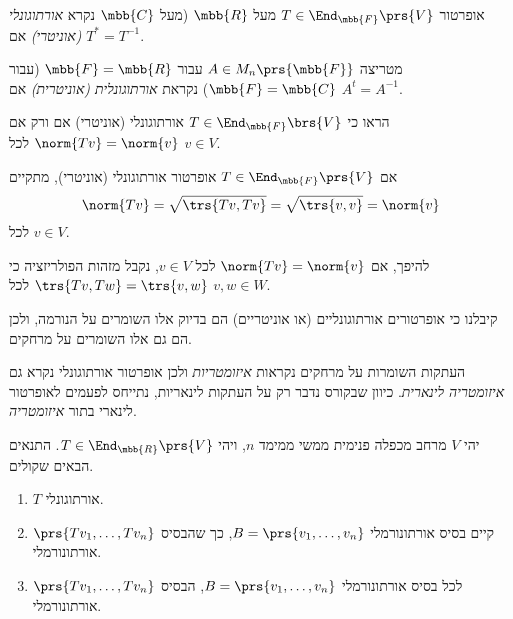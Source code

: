 \documentclass[a4paper,10pt,twoside,openany]{book}
\begin{document}
\begin{definition}
אופרטור
$T \in \End_{\mbb{F}}\prs{V}$
מעל
$\mbb{R}$
(מעל
$\mbb{C}$
נקרא
\emph{אורתוגונלי (אוניטרי)}
אם
$T^* = T^{-1}$.
\end{definition}

\begin{definition}
מטריצה
$A \in M_n\prs{\mbb{F}}$
עבור
$\mbb{F} = \mbb{R}$
(עבור
$\mbb{F} = \mbb{C}$)
נקראת
\emph{אורתוגונלית (אוניטרית)}
אם
$A^t = A^{-1}$.
\end{definition}

\begin{exercisechap}
הראו כי
$T \in \End_{\mbb{F}}\brs{V}$
אורתוגונלי (אוניטרי) אם ורק אם
$\norm{Tv} = \norm{v}$
לכל
$v \in V$.
\end{exercisechap}

\begin{solution}
אם
$T \in \End_{\mbb{F}}\prs{V}$
אופרטור אורתוגונלי (אוניטרי), מתקיים
\[\norm{Tv} = \sqrt{\trs{Tv, Tv}} = \sqrt{\trs{v,v}} = \norm{v}\]
לכל
$v \in V$.

להיפך, אם
$\norm{Tv} = \norm{v}$
לכל
$v \in V$,
נקבל מזהות הפולריזציה כי
$\trs{Tv, Tw} = \trs{v,w}$
לכל
$v,w \in W$.
\end{solution}

\begin{remark}
קיבלנו כי אופרטורים אורתוגונליים (או אוניטריים) הם בדיוק אלו השומרים על הנורמה, ולכן הם גם אלו השומרים על מרחקים.

העתקות השומרות על מרחקים נקראות
\emph{איזומטריות}
ולכן אופרטור אורתוגונלי נקרא גם
\emph{איזומטריה לינארית}.
כיוון שבקורס נדבר רק על העתקות לינאריות, נתייחס לפעמים לאופרטור לינארי בתור
\emph{איזומטריה}.
\end{remark}

\begin{proposition}
יהי
$V$
מרחב מכפלה פנימית ממשי ממימד
$n$,
ויהי
$T \in \End_{\mbb{R}}\prs{V}$.
התנאים הבאים שקולים.

\begin{enumerate}
    \item $T$ אורתוגונלי.

    \item קיים בסיס אורתונורמלי
    $B = \prs{v_1, \ldots, v_n}$,
    כך שהבסיס
    $\prs{T v_1, \ldots, Tv_n}$
    אורתונורמלי.
    
    \item לכל בסיס אורתונורמלי
    $B = \prs{v_1, \ldots, v_n}$,
    הבסיס
    $\prs{T v_1, \ldots, Tv_n}$
    אורתונורמלי.
\end{enumerate}
\end{proposition}
\end{document}
